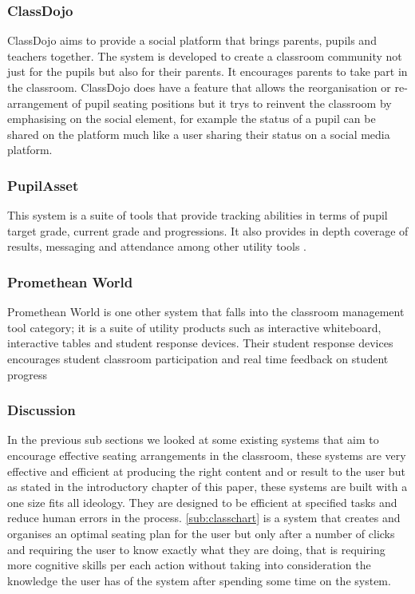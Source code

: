 \subsubsection{ClassDojo} \label{sub:classdojo}
ClassDojo \cite{website:classDojo} aims to provide a social platform that brings parents, pupils and teachers together. The system is developed to create a classroom community not just for the pupils but also for their parents. It encourages parents to take part in the classroom. ClassDojo does have a feature that allows the reorganisation or re-arrangement of pupil seating positions but it trys to reinvent the classroom by emphasising on the social element, for example the status of a pupil can be shared on the platform much like a user sharing their status on a social media platform.

\subsubsection{PupilAsset} \label{sub:pupilasset}
This system is a suite of tools that provide tracking abilities in terms of pupil target grade, current grade and progressions. It also provides in depth coverage of results, messaging and attendance among other utility tools \cite{website:PupilAsset}.

\subsubsection{Promethean World} \label{sub:promethean}
Promethean World is one other system that falls into the classroom management tool category; it is a suite of utility products such as interactive whiteboard, interactive tables and student response devices. Their student response devices encourages student classroom participation and real time feedback on student progress \cite{website:promethean}

\subsubsection{Discussion}
In the previous sub sections we looked at some existing systems that aim to encourage effective seating arrangements in the classroom, these systems are very effective and efficient at producing the right content and or result to the user but as stated in the introductory chapter of this paper, these systems are built with a one size fits all ideology. They are designed to be efficient at specified tasks and reduce human errors in the process. \ref{sub:classchart} is a system that creates and organises an optimal seating plan for the user but only after a number of clicks and requiring the user to know exactly what they are doing, that is requiring more cognitive skills per each action without taking into consideration the knowledge the user has of the system after spending some time on the system.

